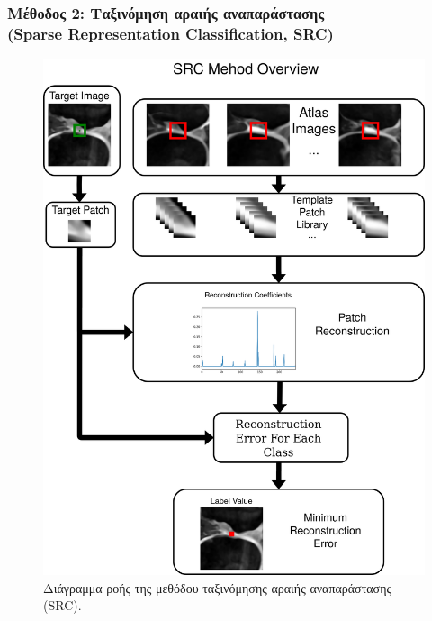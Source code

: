 \documentclass{beamer}
\begin{document}
\begin{frame}
\frametitle{Μέθοδος 2: Ταξινόμηση αραιής αναπαράστασης \\
(Sparse Representation Classification, SRC)}

\begin{figure}[H]
    \centering
    \includegraphics[height=0.8\textheight]{SRC_method.png}
    \caption{Διάγραμμα ροής της μεθόδου ταξινόμησης αραιής αναπαράστασης (SRC).}
\end{figure}

\end{frame}
\end{document}

